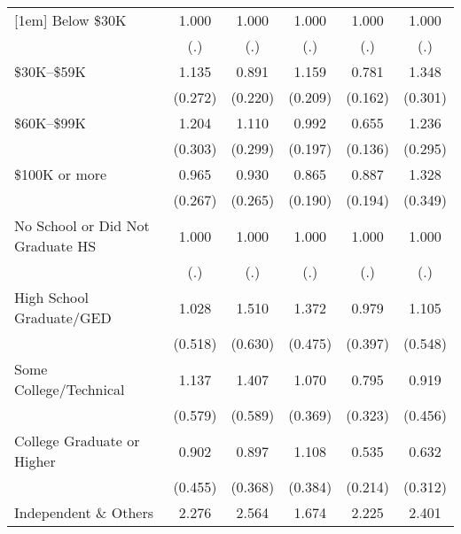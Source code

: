 \begin{table}[htbp]
\begin{tabular}{l*{5}{c}}
[1em]
Below \$30K     &    1.000         &    1.000         &    1.000         &    1.000         &    1.000         \\
                &      (.)         &      (.)         &      (.)         &      (.)         &      (.)         \\
[1em]
\$30K--\$59K    &    1.135         &    0.891         &    1.159         &    0.781         &    1.348         \\
                &  (0.272)         &  (0.220)         &  (0.209)         &  (0.162)         &  (0.301)         \\
[1em]
\$60K--\$99K    &    1.204         &    1.110         &    0.992         &    0.655\sym{**} &    1.236         \\
                &  (0.303)         &  (0.299)         &  (0.197)         &  (0.136)         &  (0.295)         \\
[1em]
\$100K or more  &    0.965         &    0.930         &    0.865         &    0.887         &    1.328         \\
                &  (0.267)         &  (0.265)         &  (0.190)         &  (0.194)         &  (0.349)         \\
[1em]
No School or Did Not Graduate HS&    1.000         &    1.000         &    1.000         &    1.000         &    1.000         \\
                &      (.)         &      (.)         &      (.)         &      (.)         &      (.)         \\
[1em]
High School Graduate/GED&    1.028         &    1.510         &    1.372         &    0.979         &    1.105         \\
                &  (0.518)         &  (0.630)         &  (0.475)         &  (0.397)         &  (0.548)         \\
[1em]
Some College/Technical&    1.137         &    1.407         &    1.070         &    0.795         &    0.919         \\
                &  (0.579)         &  (0.589)         &  (0.369)         &  (0.323)         &  (0.456)         \\
[1em]
College Graduate or Higher&    0.902         &    0.897         &    1.108         &    0.535         &    0.632         \\
                &  (0.455)         &  (0.368)         &  (0.384)         &  (0.214)         &  (0.312)         \\
[1em]
Independent \& Others&    2.276\sym{***}&    2.564\sym{***}&    1.674\sym{***}&    2.225\sym{***}&    2.401\sym{***}\\

\end{tabular}
\end{table}
